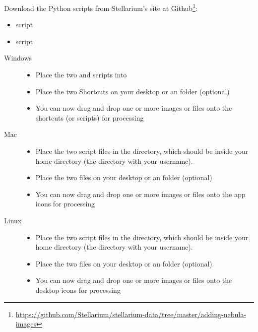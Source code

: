 Download the Python scripts from Stellarium's site at Github\footnote{\url{https://github.com/Stellarium/stellarium-data/tree/master/adding-nebula-images}}:
\begin{itemize}
\item {} script
\item {} script
\end{itemize}
\begin{description}
\item[Windows]\mbox{}
  \begin{itemize}
  \item Place the two  and  scripts into 
  \item Place the two Shortcuts on your desktop or an  folder (optional)
  \item You can now drag and drop one or more images or  files onto the shortcuts (or  scripts) for processing
  \end{itemize}
\item[Mac]\mbox{}
  \begin{itemize}
  \item Place the two  script files in the  directory, which should be inside your home directory (the directory with your username).
  \item Place the two  files on your desktop or an  folder (optional)
  \item You can now drag and drop one or more images or  files onto the  app icons for processing
  \end{itemize}
\item[Linux]\mbox{}
  \begin{itemize}
  \item Place the two  script files in the  directory, which should be inside your home directory (the directory with your username).
  \item Place the two  files on your desktop or an  folder (optional)
  \item You can now drag and drop one or more images or  files onto the desktop icons for processing
  \end{itemize}
\end{description}

